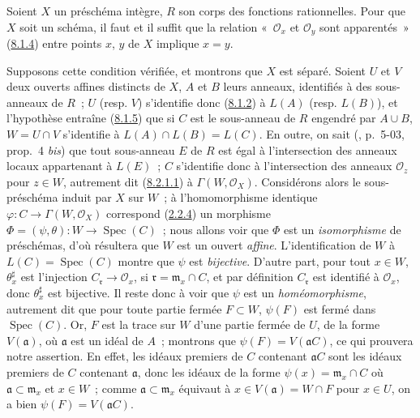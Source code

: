 \begin{proposition}[8.2.2]
\label{I.8.2.2-fr}
Soient $X$ un préschéma intègre, $R$ son corps des fonctions rationnelles.
Pour que $X$ soit un schéma, il faut et il suffit que la relation
«~$\mathscr{O}_x$ et $\mathscr{O}_y$ sont apparentés~»
(\hyperref[I.8.1.4-fr]{8.1.4}) entre points $x$, $y$ de $X$ implique $x=y$.
\end{proposition}

Supposons cette condition vérifiée, et montrons que $X$ est séparé. Soient
$U$ et $V$ deux ouverts affines distincts de $X$, $A$ et $B$ leurs anneaux,
identifiés à des sous-anneaux de $R$~; $U$ (resp. $V$) s'identifie donc
(\hyperref[I.8.1.2-fr]{8.1.2}) à $L(A)$ (resp. $L(B)$), et l'hypothèse
entraîne (\hyperref[I.8.1.5-fr]{8.1.5}) que si $C$ est le sous-anneau de $R$
engendré par $A\cup B$, $W=U\cap V$ s'identifie à
$L(A)\cap L(B)=L(C)$. En outre, on sait
(\cite{I-1}, p.~5-03, prop.~4 \emph{bis}) que tout sous-anneau $E$ de $R$ est
égal à l'intersection des anneaux locaux appartenant à $L(E)$~; $C$
s'identifie donc à l'intersection des anneaux $\mathscr{O}_z$ pour $z\in W$,
autrement dit (\hyperref[I.8.2.1.1-fr]{8.2.1.1}) à
$\Gamma(W,\mathscr{O}_X)$. Considérons alors le sous-préschéma induit par $X$
sur $W$~; à l'homomorphisme identique
$\varphi:C\to\Gamma(W,\mathscr{O}_X)$ correspond
(\hyperref[I.2.2.4-fr]{2.2.4}) un morphisme
$\Phi=(\psi,\theta):W\to\operatorname{Spec}(C)$~; nous allons voir que $\Phi$
est un \emph{isomorphisme} de préschémas, d'où résultera que $W$ est un ouvert
\emph{affine}. L'identification de $W$ à
$L(C)=\operatorname{Spec}(C)$ montre que $\psi$ est \emph{bijective}. D'autre
part, pour tout $x\in W$, $\theta_x^\sharp$ est l'injection
$C_\mathfrak r\to\mathscr{O}_x$, si
$\mathfrak r=\mathfrak m_x\cap C$, et par définition $C_\mathfrak r$ est
identifié à $\mathscr{O}_x$, donc $\theta_x^\sharp$ est bijective. Il reste
donc à voir que $\psi$ est un \emph{homéomorphisme}, autrement dit que pour
toute partie fermée $F\subset W$, $\psi(F)$ est fermé dans
$\operatorname{Spec}(C)$. Or, $F$ est la trace sur $W$ d'une partie fermée de
$U$, de la forme $V(\mathfrak a)$, où $\mathfrak a$ est un idéal de $A$~;
montrons que $\psi(F)=V(\mathfrak a C)$, ce qui prouvera notre assertion. En
effet, les idéaux premiers de $C$ contenant $\mathfrak a C$ sont les idéaux
premiers de $C$ contenant $\mathfrak a$, donc les idéaux de la forme
$\psi(x)=\mathfrak m_x\cap C$ où
$\mathfrak a\subset\mathfrak m_x$ et $x\in W$~; comme
$\mathfrak a\subset\mathfrak m_x$ équivaut à
$x\in V(\mathfrak a)=W\cap F$ pour $x\in U$, on a bien
$\psi(F)=V(\mathfrak a C)$.


